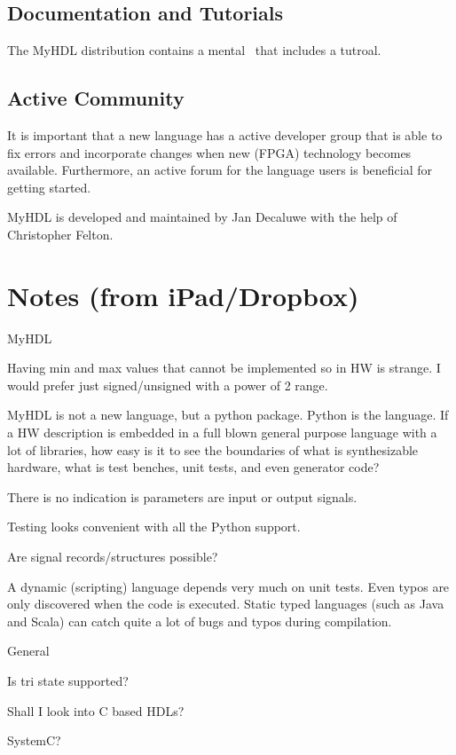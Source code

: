 \documentclass[10pt, conference, compsocconf]{IEEEtran}
\begin{document}
\subsection{Documentation and Tutorials}

The MyHDL distribution contains a mental~\cite{myhdl:2010} that includes
a tutroal.

\subsection{Active Community}

It is important that a new language has a active developer group that is
able to fix errors and incorporate changes when new (FPGA) technology
becomes available. Furthermore, an active forum for the language users
is beneficial for getting started.

MyHDL is developed and maintained by Jan Decaluwe with the help of
Christopher Felton.  

\section{Notes (from iPad/Dropbox)}

MyHDL

Having min and max values that cannot be implemented so in HW is strange. I would prefer just signed/unsigned with a power of 2 range.

MyHDL is not a new language, but a python package. Python is the language. If a HW description is embedded in a full blown general purpose language with a lot of libraries, how easy is it to see the boundaries of what is synthesizable hardware, what is test benches, unit tests, and even generator code?

There is no indication is parameters are input or output signals.

Testing looks convenient with all the Python support.

Are signal records/structures possible?

A dynamic (scripting) language depends very much on unit tests. Even typos are only
discovered when the code is executed. Static typed languages (such as Java
and Scala) can catch quite a lot of bugs and typos during compilation.

General

Is tri state supported?

Shall I look into C based HDLs?

SystemC?
\end{document}
